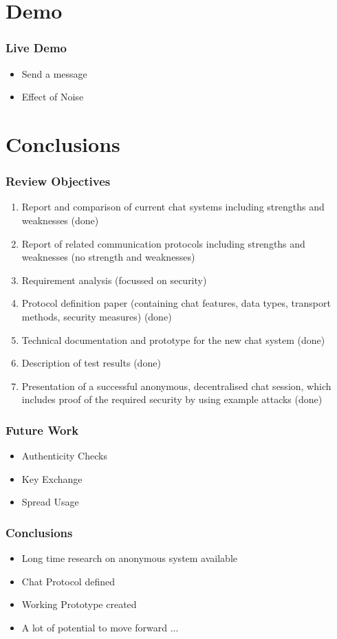 \documentclass{beamer}
\begin{document}
\section{Demo}
\frame
{
  \frametitle{Live Demo}
  \begin{itemize}
    \item Send a message
    \item Effect of Noise
  \end{itemize}
}


\section{Conclusions}
\frame
{
  \frametitle{Review Objectives}
\begin{small}
\begin{enumerate}
\item Report and comparison of current chat systems including strengths and weaknesses (\alert{done})
\item Report of related communication protocols including strengths and weaknesses (\alert{no strength and weaknesses})
\item Requirement analysis (\alert{focussed on security})
\item Protocol definition paper (containing chat features, data types, transport methods, security measures) (\alert{done})
\item Technical documentation and prototype for the new chat system (\alert{done})
\item Description of test results (\alert{done})
\item Presentation of a successful anonymous, decentralised chat session, which includes proof of the required security by using example attacks (\alert{done})
\end{enumerate}
\end{small}

}

\frame
{
  \frametitle{Future Work}
  \begin{itemize}
    \item Authenticity Checks
    \item Key Exchange
    \item Spread Usage
  \end{itemize}
}

\frame
{
  \frametitle{Conclusions}
  \begin{itemize}
    \item Long time research on anonymous system available
    \item Chat Protocol defined
    \item Working Prototype created
    \item A lot of potential to move forward ...
  \end{itemize}
}
\end{document}
